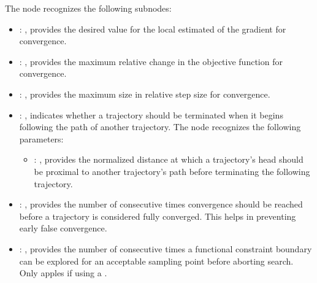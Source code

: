 \begin{itemize}
      The  node recognizes the following subnodes:
      \begin{itemize}
        \item {}: , 
          provides the desired value for the local estimated of the gradient
          for convergence. 

        \item {}: , 
          provides the maximum relative change in the objective function for convergence.

        \item {}: , 
          provides the maximum size in relative step size for convergence.

        \item {}: , 
          indicates whether a trajectory should be terminated when it begins following the path
          of another trajectory.
          The  node recognizes the following parameters:
            \begin{itemize}
              \item {}: , 
                provides the normalized distance at which a trajectory's head should be proximal to
                another trajectory's path before terminating the following trajectory.
          \end{itemize}

        \item {}: , 
          provides the number of consecutive times convergence should be reached before a trajectory
          is considered fully converged. This helps in preventing early false convergence.

        \item {}: , 
          provides the number of consecutive times a functional constraint boundary can be explored
          for an acceptable sampling point before aborting search. Only apples if using a
          . 
      \end{itemize}


\end{itemize}
